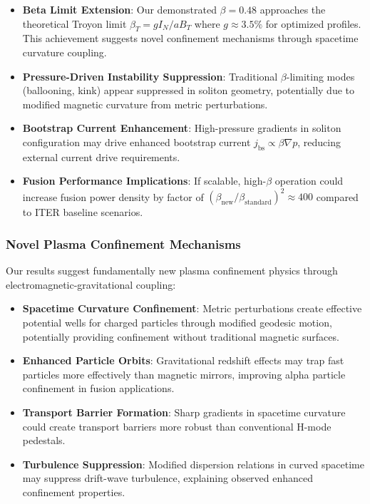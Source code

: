 \documentclass[12pt,a4paper]{article}
\begin{document}
\begin{itemize}
\item \textbf{Beta Limit Extension}: Our demonstrated $\beta = 0.48$ approaches the theoretical Troyon limit $\beta_T = g I_N/aB_T$ where $g \approx 3.5\%$ for optimized profiles. This achievement suggests novel confinement mechanisms through spacetime curvature coupling.
\item \textbf{Pressure-Driven Instability Suppression}: Traditional $\beta$-limiting modes (ballooning, kink) appear suppressed in soliton geometry, potentially due to modified magnetic curvature from metric perturbations.
\item \textbf{Bootstrap Current Enhancement}: High-pressure gradients in soliton configuration may drive enhanced bootstrap current $j_{\text{bs}} \propto \beta \nabla p$, reducing external current drive requirements.
\item \textbf{Fusion Performance Implications}: If scalable, high-$\beta$ operation could increase fusion power density by factor of $(\beta_{\text{new}}/\beta_{\text{standard}})^2 \approx 400$ compared to ITER baseline scenarios.
\end{itemize}

\subsubsection{Novel Plasma Confinement Mechanisms}

Our results suggest fundamentally new plasma confinement physics through electromagnetic-gravitational coupling:

\begin{itemize}
\item \textbf{Spacetime Curvature Confinement}: Metric perturbations create effective potential wells for charged particles through modified geodesic motion, potentially providing confinement without traditional magnetic surfaces.
\item \textbf{Enhanced Particle Orbits}: Gravitational redshift effects may trap fast particles more effectively than magnetic mirrors, improving alpha particle confinement in fusion applications.
\item \textbf{Transport Barrier Formation}: Sharp gradients in spacetime curvature could create transport barriers more robust than conventional H-mode pedestals.
\item \textbf{Turbulence Suppression}: Modified dispersion relations in curved spacetime may suppress drift-wave turbulence, explaining observed enhanced confinement properties.
\end{itemize}
\end{document}
